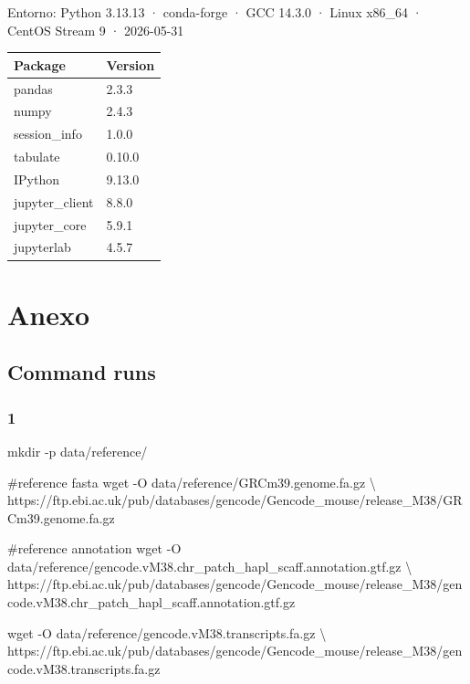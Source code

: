 \documentclass[
  9pt,
]{article}
\newenvironment{Shaded}{\begin{snugshade}}{\end{snugshade}}
\newcommand{\NormalTok}[1]{\textcolor[rgb]{0.00,0.23,0.31}{#1}}
\newcounter{none} %
\begin{document}
Entorno: Python 3.13.13 · conda-forge · GCC 14.3.0 · Linux x86\_64 ·
CentOS Stream 9 · 2026-05-31

{\def\LTcaptype{none} %
\begin{longtable}[]{@{}ll@{}}
\toprule\noalign{}
Package & Version \\
\midrule\noalign{}
\endhead
\bottomrule\noalign{}
\endlastfoot
pandas & 2.3.3 \\
numpy & 2.4.3 \\
session\_info & 1.0.0 \\
tabulate & 0.10.0 \\
IPython & 9.13.0 \\
jupyter\_client & 8.8.0 \\
jupyter\_core & 5.9.1 \\
jupyterlab & 4.5.7 \\
\end{longtable}
}

\newpage

\section{Anexo}\label{anexo}

\subsection{Command runs}\label{command-runs}

\subsubsection{1}\label{section}

\begin{Shaded}
\begin{Highlighting}[]
\NormalTok{mkdir {-}p data/reference/}

\NormalTok{\#reference fasta}
\NormalTok{wget {-}O data/reference/GRCm39.genome.fa.gz \textbackslash{}}
\NormalTok{ https://ftp.ebi.ac.uk/pub/databases/gencode/Gencode\_mouse/release\_M38/GRCm39.genome.fa.gz }

\NormalTok{\#reference annotation}
\NormalTok{wget {-}O data/reference/gencode.vM38.chr\_patch\_hapl\_scaff.annotation.gtf.gz \textbackslash{}}
\NormalTok{ https://ftp.ebi.ac.uk/pub/databases/gencode/Gencode\_mouse/release\_M38/gencode.vM38.chr\_patch\_hapl\_scaff.annotation.gtf.gz }

\NormalTok{wget {-}O data/reference/gencode.vM38.transcripts.fa.gz \textbackslash{}}
\NormalTok{https://ftp.ebi.ac.uk/pub/databases/gencode/Gencode\_mouse/release\_M38/gencode.vM38.transcripts.fa.gz}
\end{Highlighting}
\end{Shaded}
\end{document}

